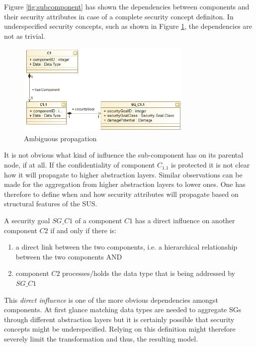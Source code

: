 Figure \ref{fig:subcomponent} has shown the dependencies between components and their security attributes in case of a complete security concept definiton. In underspecified security concepts, such as shown in Figure \ref{fig:subcomponent_dilemma}, the dependencies are not as trivial. 

\begin{figure}[H]
\centering
\includegraphics[width=0.75\textwidth]{pictures/sg_dilemma_no_goal.png}
\caption{Ambiguous propagation}
\label{fig:subcomponent_dilemma}
\end{figure} 

It is not obvious what kind of influence the sub-component has on its parental node, if at all. If the confidentiality of component $C_{1.1}$ is protected it is not clear how it will propagate to higher abstraction layers. Similar observations can be made for the aggregation from higher abstraction layers to lower ones. One has therefore to define when and how security attributes will propagate based on structural features of the SUS.

\begin{theorem}
A security goal $SG\_C1$ of a component $C1$ has a direct influence on another component $C2$ if and only if there is: 
\begin{enumerate}
\item a direct link between the two components, i.e. a hierarchical relationship between the two components AND
\item component $C2$ processes/holds the data type that is being addressed by $SG\_C1$
\end{enumerate} 
\end{theorem}

This \textit{direct influence} is one of the more obvious dependencies amongst components. At first glance matching data types are needed to aggregate SGs through different abstraction layers but it is certainly possible that security concepts might be underspecified. Relying on this definition might therefore severely limit the transformation and thus, the resulting model.

